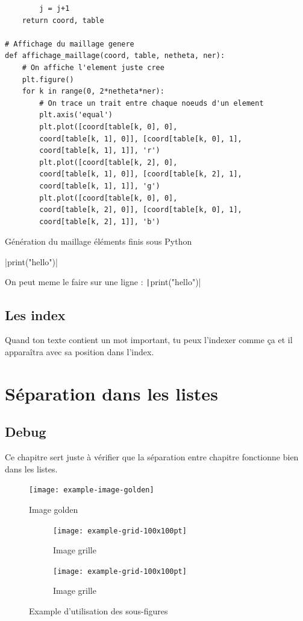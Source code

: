 \documentclass[a4paper,11pt]{report}    %
\newenvironment{longlisting}{\captionsetup{type=listing}}{} %
\begin{document}
\begin{longlisting}
\begin{verbatim}
        j = j+1
    return coord, table

# Affichage du maillage genere
def affichage_maillage(coord, table, netheta, ner):
    # On affiche l'element juste cree
    plt.figure()
    for k in range(0, 2*netheta*ner):
        # On trace un trait entre chaque noeuds d'un element
        plt.axis('equal')
        plt.plot([coord[table[k, 0], 0],
        coord[table[k, 1], 0]], [coord[table[k, 0], 1],
        coord[table[k, 1], 1]], 'r')
        plt.plot([coord[table[k, 2], 0],
        coord[table[k, 1], 0]], [coord[table[k, 2], 1],
        coord[table[k, 1], 1]], 'g')
        plt.plot([coord[table[k, 0], 0],
        coord[table[k, 2], 0]], [coord[table[k, 0], 1],
        coord[table[k, 2], 1]], 'b')
\end{verbatim}
\caption{Génération du maillage éléments finis sous Python}
\label{lst:PT_Mesh.py}
\end{longlisting}

|print("hello")| %

On peut meme le faire sur une ligne : \texttt|print("hello")|   %

\section{Les index}

Quand ton texte contient un mot important, tu peux l'indexer comme ça et il apparaîtra avec sa position dans l'index.

\chapter{Séparation dans les listes}

\section{Debug}

Ce chapitre sert juste à vérifier que la séparation entre chapitre fonctionne bien dans les listes.

\begin{figure}[H]
    \centering
    \texttt{[image: example-image-golden]}
    \caption{Image golden}
    \label{fig:example-image-golden}
\end{figure}

\begin{figure}[H]
    \begin{subfigure}[t]{0.475\textwidth}
        \texttt{[image: example-grid-100x100pt]}
        \caption{Image grille}
        \label{subfig:example-grid}
    \end{subfigure}%
    \hfill
    \begin{subfigure}[t]{0.475\textwidth}
        \texttt{[image: example-grid-100x100pt]}
        \caption{Image grille}
        \label{subfig:example-grid_bis}
    \end{subfigure}
    \caption{Example d'utilisation des sous-figures}
    \label{fig:test_subfigure_bis}
\end{figure}
\end{document}
